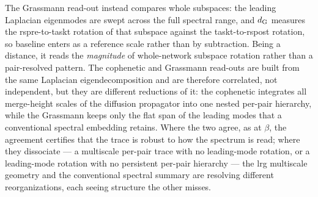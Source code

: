 The Grassmann read-out instead compares whole subspaces: the leading Laplacian eigenmodes are swept across the full spectral range, and \(d_{\rm G}\) measures the \acrshort{rspre}-to-\acrshort{taskt} rotation of that subspace against the \acrshort{taskt}-to-\acrshort{rspost} rotation, so baseline enters as a reference scale rather than by subtraction. Being a distance, it reads the \emph{magnitude} of whole-network subspace rotation rather than a pair-resolved pattern. The cophenetic and Grassmann read-outs are built from the same Laplacian eigendecomposition and are therefore correlated, not independent, but they are different reductions of it: the cophenetic integrates all merge-height scales of the diffusion propagator into one nested per-pair hierarchy, while the Grassmann keeps only the flat span of the leading modes that a conventional spectral embedding retains. Where the two agree, as at \(\beta\), the agreement certifies that the trace is robust to how the spectrum is read; where they dissociate --- a multiscale per-pair trace with no leading-mode rotation, or a leading-mode rotation with no persistent per-pair hierarchy --- the \gls{lrg} multiscale geometry and the conventional spectral summary are resolving different reorganizations, each seeing structure the other misses.



